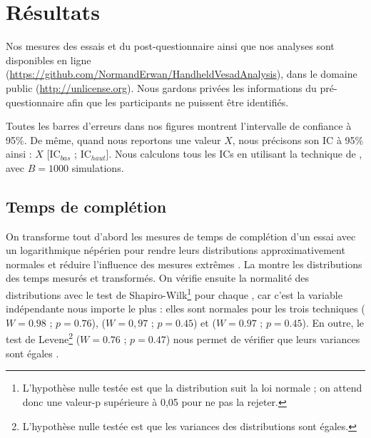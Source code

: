 \section{Résultats}
\label{sec:experiment_results}

Nos mesures des essais et du post-questionnaire ainsi que nos analyses sont disponibles en ligne (\url{https://github.com/NormandErwan/HandheldVesadAnalysis}), dans le domaine public (\url{http://unlicense.org}). Nous gardons privées les informations du pré-questionnaire afin que les participants ne puissent être identifiés.

Toutes les barres d'erreurs dans nos figures montrent l'intervalle de confiance à 95\%. De même, quand nous reportons une valeur $X$, nous précisons son IC à 95\% ainsi : $X$ [$\text{IC}_{bas}$ ; $\text{IC}_{haut}$]. Nous calculons tous les ICs en utilisant la technique de  \citep[p. 25]{Dragicevic2016}, avec $B=1000$ simulations.

\subsection{Temps de complétion}
\label{subsec:experiment_results_time}


On transforme tout d'abord les mesures de temps de complétion d'un essai avec un logarithmique népérien pour rendre leurs distributions approximativement normales et réduire l'influence des mesures extrêmes \citep[p. 25]{Dragicevic2016}. La  montre les distributions des temps mesurés et transformés. On vérifie ensuite la normalité des distributions avec le test de Shapiro-Wilk\footnote{L'hypothèse nulle testée est que la distribution suit la loi normale ; on attend donc une valeur-p supérieure à 0,05 pour ne pas la rejeter.} \citep{Wobbrock2016} pour chaque , car c'est la variable indépendante nous importe le plus : elles sont normales pour les trois techniques  ($W = \num{0.98}$ ; $p = \num{0.76}$),  ($W = 0,97$ ; $p = \num{0.45}$) et  ($W = \num{0.97}$ ; $p = \num{0.45}$). En outre, le test de Levene\footnote{L'hypothèse nulle testée est que les variances des distributions sont égales.} ($W = \num{0.76}$ ; $p = \num{0.47}$) nous permet de vérifier que leurs variances sont égales \citep{Wobbrock2016}.

